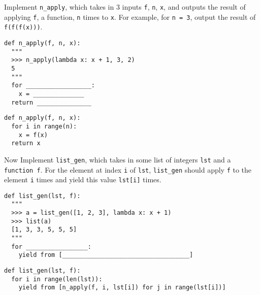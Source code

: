 \begin{blocksection}
\question Implement \texttt{n\_apply}, which takes in 3 inputs \texttt{f}, \texttt{n}, \texttt{x}, and outputs the result of applying \texttt{f}, a function, \texttt{n} times to \texttt{x}. For example, for \texttt{n = 3}, output the result of \texttt{f(f(f(x)))}.

\begin{lstlisting}
def n_apply(f, n, x):
  """
  >>> n_apply(lambda x: x + 1, 3, 2)
  5
  """
  for __________________:
    x = ______________
  return _______________
\end{lstlisting}

\begin{solution}
\begin{lstlisting}
def n_apply(f, n, x):
  for i in range(n):
    x = f(x)
  return x
\end{lstlisting}
\end{solution}

Now Implement \texttt{list\_gen}, which takes in some list of integers \texttt{lst} and a \texttt{function f}. For the element at index \texttt{i} of \texttt{lst}, \texttt{list\_gen} should apply \texttt{f} to the element \texttt{i} times and yield this value \texttt{lst[i]} times.

\begin{lstlisting}
def list_gen(lst, f):
  """
  >>> a = list_gen([1, 2, 3], lambda x: x + 1)
  >>> list(a)
  [1, 3, 3, 5, 5, 5]
  """
  for _________________:
    yield from [___________________________________]
\end{lstlisting}

\begin{solution}
\begin{lstlisting}
def list_gen(lst, f):
  for i in range(len(lst)):
    yield from [n_apply(f, i, lst[i]) for j in range(lst[i])]
\end{lstlisting}
\end{solution}
\end{blocksection}
